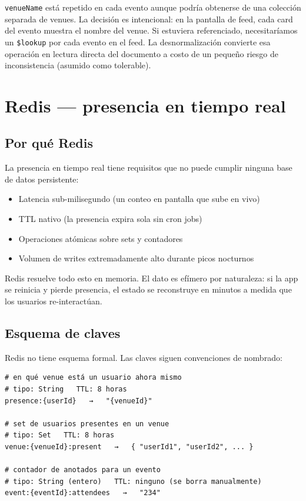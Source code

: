 \documentclass[12pt, a4paper]{article}
\newcommand{\code}[1]{\texttt{#1}}
\begin{document}
\code{venueName} está repetido en cada evento aunque podría obtenerse
de una colección separada de venues. La decisión es intencional:
en la pantalla de feed, cada card del evento muestra el nombre del venue.
Si estuviera referenciado, necesitaríamos un \code{\$lookup} por cada
evento en el feed. La desnormalización convierte esa operación en lectura
directa del documento a costo de un pequeño riesgo de inconsistencia
(asumido como tolerable).

\section{Redis — presencia en tiempo real}
\label{sec:redis}

\subsection{Por qué Redis}

La presencia en tiempo real tiene requisitos que no puede cumplir ninguna
base de datos persistente:

\begin{itemize}[nosep]
  \item Latencia sub-milisegundo (un conteo en pantalla que sube en vivo)
  \item TTL nativo (la presencia expira sola sin cron jobs)
  \item Operaciones atómicas sobre sets y contadores
  \item Volumen de writes extremadamente alto durante picos nocturnos
\end{itemize}

Redis resuelve todo esto en memoria. El dato es efímero por naturaleza:
si la app se reinicia y pierde presencia, el estado se reconstruye en minutos
a medida que los usuarios re-interactúan.

\subsection{Esquema de claves}

Redis no tiene esquema formal. Las claves siguen convenciones de nombrado:

\begin{lstlisting}[style=redis, caption={patrones de clave en Redis}]
# en qué venue está un usuario ahora mismo
# tipo: String   TTL: 8 horas
presence:{userId}   →   "{venueId}"

# set de usuarios presentes en un venue
# tipo: Set   TTL: 8 horas
venue:{venueId}:present   →   { "userId1", "userId2", ... }

# contador de anotados para un evento
# tipo: String (entero)   TTL: ninguno (se borra manualmente)
event:{eventId}:attendees   →   "234"
\end{lstlisting}
\end{document}
